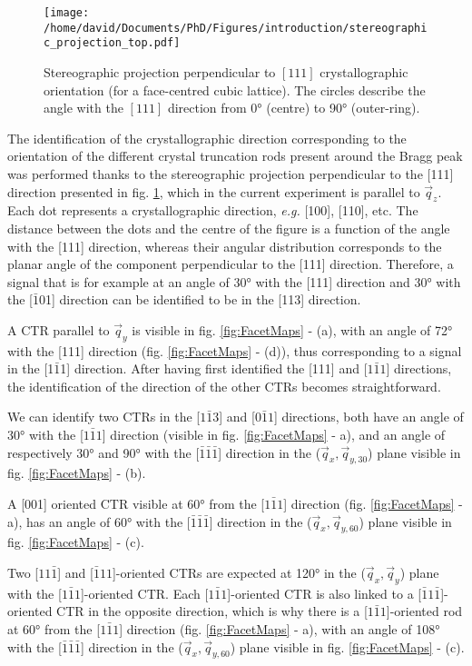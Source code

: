 \begin{figure}[!htb]
    \centering
    \texttt{[image: /home/david/Documents/PhD/Figures/introduction/stereographic\_projection\_top.pdf]}
    \caption{
        Stereographic projection perpendicular to $[111]$ crystallographic orientation (for a face-centred cubic lattice).
        The circles describe the angle with the $[111]$ direction from \ang{0} (centre) to \ang{90} (outer-ring).
    }
    \label{fig:StereoTop}
\end{figure}

The identification of the crystallographic direction corresponding to the orientation of the different crystal truncation rods present around the Bragg peak was performed thanks to the stereographic projection perpendicular to the [111] direction presented in fig. \ref{fig:StereoTop}, which in the current experiment is parallel to $\vec{q}_z$.
Each dot represents a crystallographic direction, \textit{e.g.} [100], [110], etc.
The distance between the dots and the centre of the figure is a function of the angle with the [111] direction, whereas their angular distribution corresponds to the planar angle of the component perpendicular to the [111] direction.
Therefore, a signal that is for example at an angle of \ang{30} with the [111] direction and \ang{30} with the [$\bar{1}$01] direction can be identified to be in the [113] direction.

A CTR parallel to $\vec{q}_y$ is visible in fig. \ref{fig:FacetMaps} - (a), with an angle of \ang{72} with the [111] direction (fig. \ref{fig:FacetMaps} - (d)), thus corresponding to a signal in the [1$\bar{1}$1] direction.
After having first identified the [111] and [$1\bar{1}1$] directions, the identification of the direction of the other CTRs becomes straightforward.

We can identify two CTRs in the [$1\bar{1}3$] and [$0\bar{1}1$] directions, both have an angle of \ang{30} with the [$1\bar{1}1$] direction (visible in  fig. \ref{fig:FacetMaps} - a), and an angle of respectively \ang{30} and \ang{90} with the [$\bar{1}\bar{1}\bar{1}$] direction in the ($\vec{q}_x, \vec{q}_{y, 30}$) plane visible in fig. \ref{fig:FacetMaps} - (b).

A [001] oriented CTR visible at \ang{60} from the [$1\bar{1}1$] direction (fig. \ref{fig:FacetMaps} - a), has an angle of \ang{60} with the [$\bar{1}\bar{1}\bar{1}$] direction in the ($\vec{q}_x, \vec{q}_{y, 60}$) plane visible in fig. \ref{fig:FacetMaps} - (c).

Two [$11\bar{1}$] and [$\bar{1}11$]-oriented CTRs are expected at \ang{120} in the ($\vec{q}_x, \vec{q}_y$) plane with the [$1\bar{1}1$]-oriented CTR.
Each [$1\bar{1}1$]-oriented CTR is also linked to a [$\bar{1}1\bar{1}$]-oriented CTR in the opposite direction, which is why there is a [$1\bar{1}1$]-oriented rod at \ang{60} from the [$1\bar{1}1$] direction (fig. \ref{fig:FacetMaps} - a), with an angle of \ang{108} with the [$\bar{1}\bar{1}\bar{1}$] direction in the ($\vec{q}_x, \vec{q}_{y, 60}$) plane visible in fig. \ref{fig:FacetMaps} - (c).

